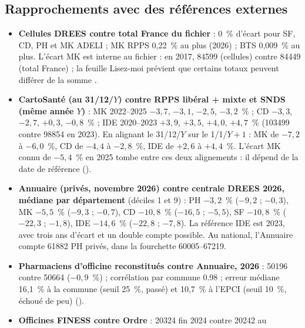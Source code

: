 \subsection{Rapprochements avec des références externes}\label{don:rapprochements}

\begin{itemize}
  \item \textbf{Cellules DREES contre total France du fichier} : 0~\%\mesure{} d'écart pour SF, CD, PH et MK
  ADELI ; MK RPPS 0,22~\%\mesure{} au plus (2026) ; BTS 0,009~\%\mesure{} au plus. L'écart MK est interne au
  fichier : en 2017, \num{84599}\mesure{} (cellules) contre \num{84449}\mesure{} (total France) ; la feuille
  Lisez-moi prévient que certains totaux peuvent différer de la somme \citep{d-drees2026demo}.
  \item \textbf{CartoSanté (au 31/12/$Y$) contre RPPS libéral + mixte et SNDS (même année $Y$)} : MK 2022--2025
  $-3{,}7$, $-3{,}1$, $-2{,}5$, $-3{,}2$~\%\mesure{} ; CD $-3{,}3$, $-2{,}7$, $+0{,}3$, $-0{,}8$~\%\mesure{} ;
  IDE 2020--2023 $+3{,}9$, $+3{,}5$, $+4{,}0$, $+4{,}7$~\%\mesure{} (\num{103499} contre \num{98854}\mesure{} en
  2023). En alignant le 31/12/$Y$ sur le 1/1/$Y+1$ : MK de $-7{,}2$ à $-6{,}0$~\%\mesure{}, CD de $-4{,}4$ à
  $-2{,}8$~\%\mesure{}, IDE de $+2{,}6$ à $+4{,}4$~\%\mesure. L'écart MK connu de $-5{,}4$~\%\mesure{} en 2025
  tombe entre ces deux alignements : il dépend de la date de référence\derive{} ().
  \item \textbf{Annuaire (privés, novembre 2026) contre centrale DREES 2026, médiane par département} (déciles
  1 et 9) : PH $-3{,}2$~\% ($-9{,}2$ ; $-0{,}3$), MK $-5{,}5$~\% ($-9{,}3$ ; $-0{,}7$), CD $-10{,}8$~\%
  ($-16{,}5$ ; $-5{,}5$), SF $-10{,}8$~\% ($-22{,}3$ ; $-1{,}8$), IDE $-14{,}6$~\% ($-22{,}8$ ;
  $-7{,}8$)\mesure. La référence IDE est 2023, avec trois ans d'écart et un double compte possible. Au national,
  l'Annuaire compte \num{61882}\mesure{} PH privés, dans la fourchette \num{60005}--\num{67219}.
  \item \textbf{Pharmaciens d'officine reconstitués contre Annuaire, 2026} : \num{50196} contre
  \num{50664}\mesure{} ($-0{,}9$~\%\derive) ; corrélation par commune \num{0.98}\mesure{} ; erreur médiane
  16,1~\%\mesure{} à la commune (seuil 25~\%\suppose, passé) et 10,7~\%\mesure{} à l'EPCI (seuil
  10~\%\suppose, échoué de peu) ().
  \item \textbf{Officines FINESS contre Ordre} : \num{20324}\mesure{} fin 2024 contre \num{20242}\mesure{} au

\end{itemize}
